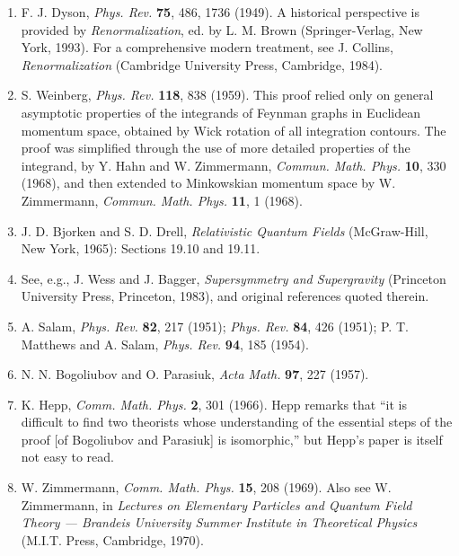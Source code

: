 \begin{enumerate}
\item\label{ref:12.1} F. J. Dyson, \emph{Phys. Rev.} \textbf{75}, 486, 1736
(1949). A historical perspective is provided by \emph{Renormalization}, ed. by
L. M. Brown (Springer-Verlag, New York, 1993). For a comprehensive modern
treatment, see J. Collins, \emph{Renormalization} (Cambridge University Press,
Cambridge, 1984).

\item\label{ref:12.2} S. Weinberg, \emph{Phys. Rev.} \textbf{118}, 838 (1959).
This proof relied only on general asymptotic properties of the integrands of
Feynman graphs in Euclidean momentum space, obtained by Wick rotation of all
integration contours. The proof was simplified through the use of more
detailed properties of the integrand, by Y. Hahn and W. Zimmermann,
\emph{Commun. Math. Phys.} \textbf{10}, 330 (1968), and then extended to
Minkowskian momentum space by W. Zimmermann, \emph{Commun. Math. Phys.}
\textbf{11}, 1 (1968).

\item\label{ref:12.3} J. D. Bjorken and S. D. Drell, \emph{Relativistic
Quantum Fields} (McGraw-Hill, New York, 1965): Sections 19.10 and 19.11.

\item\label{ref:12.4} See, e.g., J. Wess and J. Bagger,
\emph{Supersymmetry and Supergravity} (Princeton University Press, Princeton,
1983), and original references quoted therein.

\item\label{ref:12.5} A. Salam, \emph{Phys. Rev.} \textbf{82}, 217 (1951);
\emph{Phys. Rev.} \textbf{84}, 426 (1951); P. T. Matthews and A. Salam,
\emph{Phys. Rev.} \textbf{94}, 185 (1954).

\item\label{ref:12.6} N. N. Bogoliubov and O. Parasiuk, \emph{Acta Math.}
\textbf{97}, 227 (1957).

\item\label{ref:12.7} K. Hepp, \emph{Comm. Math. Phys.} \textbf{2}, 301
(1966). Hepp remarks that \textquotedblleft it is difficult to find two
theorists whose understanding of the essential steps of the proof [of
Bogoliubov and Parasiuk] is isomorphic,\textquotedblright{} but Hepp's paper is
itself not easy to read.

\item\label{ref:12.8} W. Zimmermann, \emph{Comm. Math. Phys.} \textbf{15}, 208
(1969). Also see W. Zimmermann, in \emph{Lectures on Elementary Particles and
Quantum Field Theory --- Brandeis University Summer Institute in Theoretical
Physics} (M.I.T. Press, Cambridge, 1970).


\end{enumerate}
